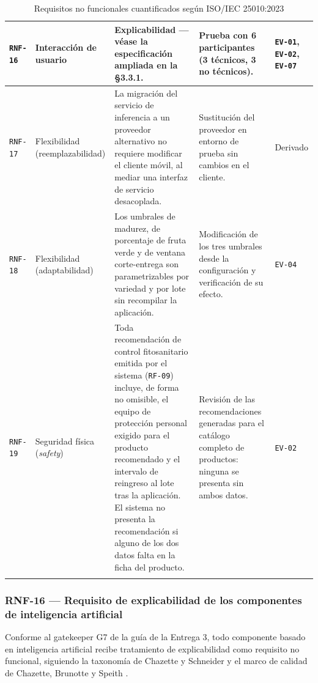 \documentclass[11pt,a4paper]{article}
\newcommand{\id}[1]{\texttt{\begingroup\hyphenpenalty=10000\relax#1\endgroup}}
\renewcommand{\id}[1]{\texttt{#1}}
\begin{document}
{\begin{longtable}{|C{1.2cm}|L{2.4cm}|L{5.8cm}|L{3.1cm}|L{2.2cm}|}
\id{RNF-16} & Interacción de usuario & \textbf{Explicabilidad} --- véase la especificación ampliada en la §3.3.1. & Prueba con 6 participantes (3 técnicos, 3 no técnicos). & \footnotesize \id{EV-01}, \id{EV-02}, \id{EV-07} \\ \hline
\id{RNF-17} & Flexibilidad \newline \footnotesize(reemplazabilidad) & La migración del servicio de inferencia a un proveedor alternativo no requiere modificar el cliente móvil, al mediar una interfaz de servicio desacoplada. & Sustitución del proveedor en entorno de prueba sin cambios en el cliente. & \footnotesize Derivado \\ \hline
\id{RNF-18} & Flexibilidad \newline \footnotesize(adaptabilidad) & Los umbrales de madurez, de porcentaje de fruta verde y de ventana corte-entrega son parametrizables por variedad y por lote sin recompilar la aplicación. & Modificación de los tres umbrales desde la configuración y verificación de su efecto. & \footnotesize \id{EV-04} \\ \hline
\id{RNF-19} & Seguridad física \newline \footnotesize(\emph{safety}) & Toda recomendación de control fitosanitario emitida por el sistema (\id{RF-09}) incluye, de forma no omisible, el equipo de protección personal exigido para el producto recomendado y el intervalo de reingreso al lote tras la aplicación. El sistema no presenta la recomendación si alguno de los dos datos falta en la ficha del producto. & Revisión de las recomendaciones generadas para el catálogo completo de productos: ninguna se presenta sin ambos datos. & \footnotesize \id{EV-02} \\ \hline
\caption{Requisitos no funcionales cuantificados según ISO/IEC 25010:2023}
\end{longtable}}

\subsubsection{RNF-16 --- Requisito de explicabilidad de los componentes de inteligencia artificial}

Conforme al gatekeeper G7 de la guía de la Entrega 3, todo componente basado en inteligencia
artificial recibe tratamiento de explicabilidad como requisito no funcional, siguiendo la taxonomía
de Chazette y Schneider \cite{chazette2020} y el marco de calidad de Chazette, Brunotte y Speith
\cite{chazette2021,chazette2022}.
\end{document}
